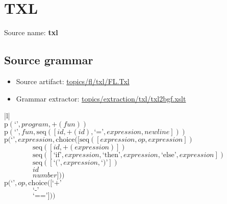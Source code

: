 \chapter{TXL}

 Source name: \textbf{txl}

\section{Source grammar}

\begin{itemize}
\item Source artifact: \href{http://github.com/grammarware/slps/blob/master/topics/fl/txl/FL.Txl}{topics/fl/txl/FL.Txl}
\item Grammar extractor: \href{http://github.com/grammarware/slps/blob/master/topics/extraction/txl/txl2bgf.xslt}{topics/extraction/txl/txl2bgf.xslt}
\end{itemize}

\footnotesize\begin{center}\begin{tabular}{|l|}\hline
{}
\\\hline
$\mathrm{p}(\text{`'},\mathit{program},\plus \left(\mathit{fun}\right))$	\\
$\mathrm{p}(\text{`'},\mathit{fun},\mathrm{seq}\left(\left[\mathit{id}, \plus \left(\mathit{id}\right), \text{`='}, \mathit{expression}, \mathit{newline}\right]\right))$	\\
$\mathrm{p}(\text{`'},\mathit{expression},\mathrm{choice}([\mathrm{seq}\left(\left[\mathit{expression}, \mathit{op}, \mathit{expression}\right]\right)$\\$\qquad\qquad\mathrm{seq}\left(\left[\mathit{id}, \plus \left(\mathit{expression}\right)\right]\right)$\\$\qquad\qquad\mathrm{seq}\left(\left[\text{`if'}, \mathit{expression}, \text{`then'}, \mathit{expression}, \text{`else'}, \mathit{expression}\right]\right)$\\$\qquad\qquad\mathrm{seq}\left(\left[\text{`('}, \mathit{expression}, \text{`)'}\right]\right)$\\$\qquad\qquad\mathit{id}$\\$\qquad\qquad\mathit{number}]))$	\\
$\mathrm{p}(\text{`'},\mathit{op},\mathrm{choice}([\text{`+'}$\\$\qquad\qquad\text{`-'}$\\$\qquad\qquad\text{`=='}]))$	\\
\hline\end{tabular}\end{center}



